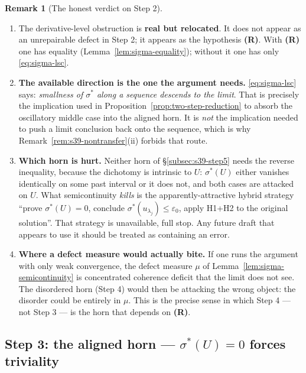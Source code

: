 \documentclass[11pt]{article}
\theoremstyle{definition}
\newtheorem{remark}[theorem]{Remark}
\theoremstyle{remark}
\begin{document}
\begin{remark}[The honest verdict on Step 2]\label{rem:s39-step2-verdict}
  \begin{enumerate}[label=(\roman*)]
  \item The derivative-level obstruction is \textbf{real but relocated}. It
    does not appear as an unrepairable defect in Step 2; it appears as the
    hypothesis \textbf{(R)}. With \textbf{(R)} one has equality
    (Lemma~\ref{lem:sigma-equality}); without it one has only
    \eqref{eq:sigma-lsc}.
  \item \textbf{The available direction is the one the argument needs.}
    \eqref{eq:sigma-lsc} says: \emph{smallness of $\sigma^*$ along a
    sequence descends to the limit}. That is precisely the implication used
    in Proposition~\ref{prop:two-step-reduction} to absorb the oscillatory
    middle case into the aligned horn. It is \emph{not} the implication
    needed to push a limit conclusion back onto the sequence, which is why
    Remark~\ref{rem:s39-nontransfer}(ii) forbids that route.
  \item \textbf{Which horn is hurt.} Neither horn of
    \S\ref{subsec:s39-step5} needs the reverse inequality, because the
    dichotomy is intrinsic to $U$: $\sigma^*(U)$ either vanishes
    identically on some past interval or it does not, and both cases are
    attacked on $U$. What semicontinuity \emph{kills} is the
    apparently-attractive hybrid strategy ``prove $\sigma^*(U)=0$, conclude
    $\sigma^*(u_{\lambda_j})\leq\varepsilon_0$, apply H1+H2 to the original
    solution''. That strategy is unavailable, full stop. Any future draft
    that appears to use it should be treated as containing an error.
  \item \textbf{Where a defect measure would actually bite.} If one runs the
    argument with only weak convergence, the defect measure $\mu$ of
    Lemma~\ref{lem:sigma-semicontinuity} is concentrated coherence deficit
    that the limit does not see. The disordered horn (Step 4) would then be
    attacking the wrong object: the disorder could be entirely in $\mu$. This
    is the precise sense in which Step 4 --- not Step 3 --- is the horn that
    depends on \textbf{(R)}.
  \end{enumerate}
\end{remark}

\subsection{Step 3: the aligned horn --- $\sigma^*(U)=0$ forces triviality}
\label{subsec:s39-step3}
\end{document}
